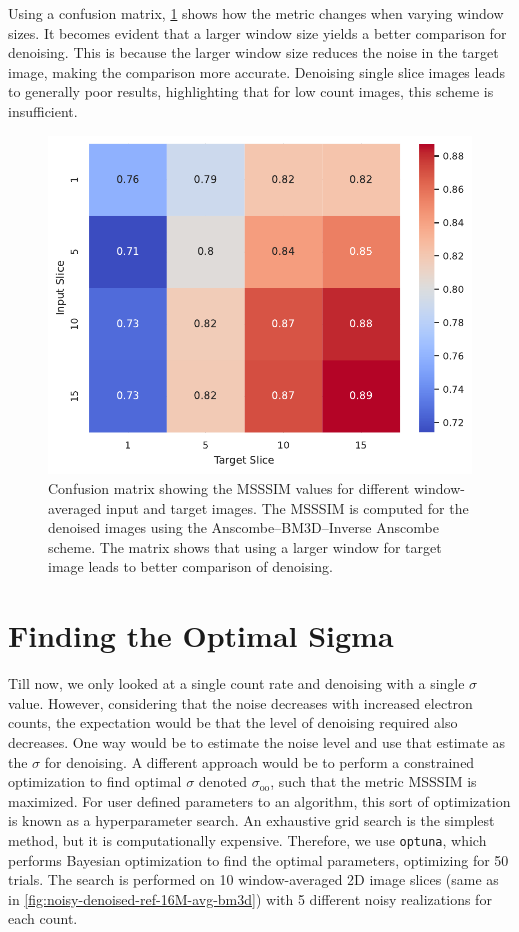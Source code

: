 Using a confusion matrix, \cref{fig:confusion_matrix_msssim_window_avg} shows how the metric changes when varying window sizes. It becomes evident that a larger window size yields a better comparison for denoising. This is because the larger window size reduces the noise in the target image, making the comparison more accurate. Denoising single slice images leads to generally poor results, highlighting that for low count images, this scheme is insufficient.

\begin{figure}[h]
    \centering
    \includegraphics[width=0.5\linewidth]{images/confusion_matrix_msssim_window_avg.pdf}
    \caption{Confusion matrix showing the \gls{MSSSIM} values for different window-averaged input and target images. The \gls{MSSSIM} is computed for the denoised images using the Anscombe--\gls{BM3D}--Inverse Anscombe scheme. The matrix shows that using a larger window for target image leads to better comparison of denoising.}
    \label{fig:confusion_matrix_msssim_window_avg}
\end{figure}

\section{Finding the Optimal Sigma}
Till now, we only looked at a single count rate and denoising with a single $\sigma$ value. However, considering that the noise decreases with increased electron counts, the expectation would be that the level of denoising required also decreases. One way would be to estimate the noise level and use that estimate as the $\sigma$ for denoising. A different approach would be to perform a constrained optimization to find optimal $\sigma$ denoted $\sigma_{\text{oo}}$, such that the metric \gls{MSSSIM} is maximized. For user defined parameters to an algorithm, this sort of optimization is known as a hyperparameter search. An exhaustive grid search is the simplest method, but it is computationally expensive. Therefore, we use \texttt{optuna}, which performs Bayesian optimization to find the optimal parameters, optimizing for \num{50} trials. The search is performed on \num{10} window-averaged 2D image slices (same as in \cref{fig:noisy-denoised-ref-16M-avg-bm3d}) with 5 different noisy realizations for each count.


